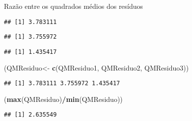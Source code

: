\documentclass[
  ignorenonframetext,
]{beamer}
\newenvironment{Shaded}{\begin{snugshade}}{\end{snugshade}}
\newcommand{\DecValTok}[1]{\textcolor[rgb]{0.00,0.00,0.81}{#1}}
\newcommand{\FunctionTok}[1]{\textcolor[rgb]{0.13,0.29,0.53}{\textbf{#1}}}
\newcommand{\NormalTok}[1]{#1}
\newcommand{\OtherTok}[1]{\textcolor[rgb]{0.56,0.35,0.01}{#1}}
\newcommand{\SpecialCharTok}[1]{\textcolor[rgb]{0.81,0.36,0.00}{\textbf{#1}}}
\newcommand{\StringTok}[1]{\textcolor[rgb]{0.31,0.60,0.02}{#1}}
\begin{document}
\begin{frame}[fragile]{Razão entre os quadrados médios dos resíduos}
\protect\hypertarget{razuxe3o-entre-os-quadrados-muxe9dios-dos-resuxedduos}{}
\begin{Shaded}
\end{Shaded}

\begin{verbatim}
## [1] 3.783111
\end{verbatim}

\begin{Shaded}
\end{Shaded}

\begin{verbatim}
## [1] 3.755972
\end{verbatim}

\begin{Shaded}
\end{Shaded}

\begin{verbatim}
## [1] 1.435417
\end{verbatim}

\begin{Shaded}
\begin{Highlighting}[]
\NormalTok{(QMResiduo}\OtherTok{\textless{}{-}} \FunctionTok{c}\NormalTok{(QMResiduo1, QMResiduo2, QMResiduo3))}
\end{Highlighting}
\end{Shaded}

\begin{verbatim}
## [1] 3.783111 3.755972 1.435417
\end{verbatim}

\begin{Shaded}
\begin{Highlighting}[]
\NormalTok{(}\FunctionTok{max}\NormalTok{(QMResiduo)}\SpecialCharTok{/}\FunctionTok{min}\NormalTok{(QMResiduo))}
\end{Highlighting}
\end{Shaded}

\begin{verbatim}
## [1] 2.635549
\end{verbatim}
\end{frame}
\end{document}
